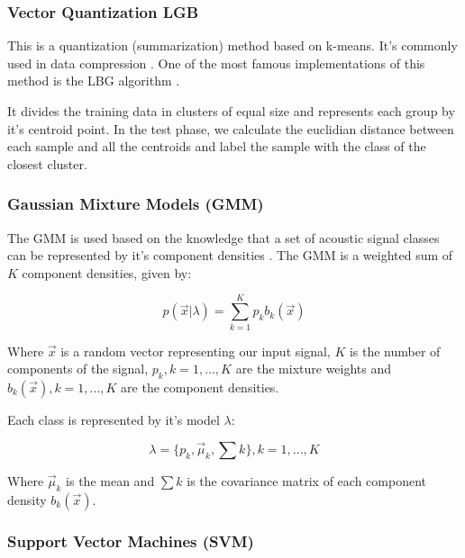 \documentclass[12pt]{article}
\begin{document}
\subsubsection{Vector Quantization LGB} \label{class:qvlgb}

This is a quantization (summarization) method based on k-means. It's commonly used in data compression \cite{kekre2008speech}. One of the most famous implementations of this method is the LBG algorithm \cite{linde1980algorithm}. 

It divides the training data in clusters of equal size and represents each group by it's centroid point. In the test phase, we calculate the euclidian distance between each sample and all the centroids and label the sample with the class of the closest cluster.

\subsubsection{Gaussian Mixture Models (GMM)} \label{class:gmm}


The GMM is used based on the knowledge that a set of acoustic signal classes can be represented by it's component densities \cite{reynolds1995robust}. The GMM is a weighted sum of $K$ component densities, given by:

\begin{equation}
	p(\vec{x}|\lambda) = \sum_{k=1}^{K} p_kb_k(\vec{x})
	\label{eq:gmm}
\end{equation}

Where $\vec{x}$ is a random vector representing our input signal, $K$ is the number of components of the signal, $p_k, k = 1,...,K$ are the mixture weights and $b_k(\vec{x}), k = 1,...,K$ are the component densities.

Each class is represented by it's model $\lambda$:

\begin{equation}
	\lambda = \{ p_k, \vec{\mu}_k, \sum k \}, k = 1,...,K
	\label{eq:lambda}
\end{equation}

Where $\vec{\mu}_k$ is the mean and $\sum k$ is the covariance matrix of each component density $b_k(\vec{x})$.



\subsubsection{Support Vector Machines (SVM)} \label{class:svm}
\end{document}
